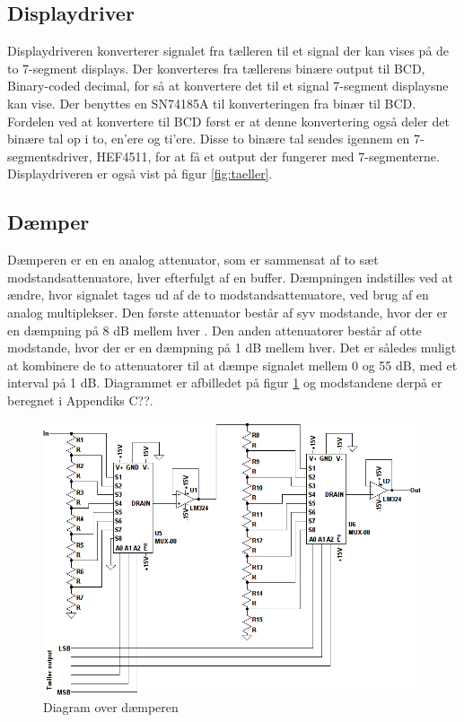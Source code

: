 \subsection*{Displaydriver}
\label{volumenkontrol-design-display_driver}
Displaydriveren konverterer signalet fra tælleren til et signal der kan vises på de to 7-segment displays. Der konverteres fra tællerens binære output til BCD, Binary-coded decimal, for så at konvertere det til et signal 7-segment displaysne kan vise. Der benyttes en SN74185A til konverteringen fra binær til BCD. Fordelen ved at konvertere til BCD først er at denne konvertering også deler det binære tal op i to, en'ere og ti'ere. Disse to binære tal sendes igennem en 7-segmentsdriver, HEF4511, for at få et output der fungerer med 7-segmenterne. Displaydriveren er også vist på figur \ref{fig:taeller}.

\subsection*{Dæmper}
\label{volumenkontrol-design-daemper}
Dæmperen er en en analog attenuator, som er sammensat af to sæt modstandsattenuatore, hver efterfulgt af en buffer. Dæmpningen indstilles ved at ændre, hvor signalet tages ud af de to modstandsattenuatore, ved brug af en analog multiplekser. Den første attenuator består af syv modstande, hvor der er en dæmpning på 8 dB mellem hver . Den anden attenuatorer består af otte modstande, hvor der er en dæmpning på 1 dB mellem hver. Det er således muligt at kombinere de to attenuatorer til at dæmpe signalet mellem 0 og 55 dB, med et interval på 1 dB. Diagrammet er afbilledet på figur \ref{fig:volumenkontrol_daemper} og modstandene derpå er beregnet i Appendiks C??.

\begin{figure}[h]
\centering
\includegraphics[width=\textwidth]{teknisk/volumenkontrol/daemper.png}
\caption{Diagram over dæmperen}
\label{fig:volumenkontrol_daemper}
\end{figure}

